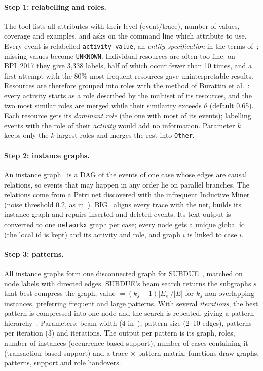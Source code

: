 \documentclass{article}
\begin{document}
\paragraph{Step 1: relabelling and roles.} The tool lists all attributes with
their level (event/trace), number of values, coverage and examples, and asks on
the command line which attribute to use. Every event is relabelled
\texttt{activity\_value}, an \emph{entity specification} in the terms
of~\cite{diamantini2016behavioral}; missing values become \texttt{UNKNOWN}.
Individual resources are often too fine: on BPI~2017 they give 3,338 labels,
half of which occur fewer than 10 times, and a first attempt with the 80\% most
frequent resources gave uninterpretable results. Resources are therefore
grouped into roles with the method of Burattin et al.~\cite{burattin2013roles}:
every activity starts as a role described by the multiset of its resources, and
the two most similar roles are merged while their similarity exceeds $\theta$
(default 0.65). Each resource gets its \emph{dominant role} (the one with most
of its events); labelling events with the role of their \emph{activity} would
add no information. Parameter $k$ keeps only the $k$ largest roles and merges
the rest into \texttt{Other}.

\paragraph{Step 2: instance graphs.} An instance graph~\cite{vandongen2004instance}
is a DAG of the events of one case whose edges are causal relations, so events
that may happen in any order lie on parallel branches. The relations come from
a Petri net discovered with the infrequent Inductive Miner (noise threshold
0.2, as in~\cite{diamantini2016behavioral}). BIG~\cite{diamantini2016big} aligns
every trace with the net, builds its instance graph and repairs inserted and
deleted events. Its text output is converted to one \texttt{networkx} graph per
case; every node gets a unique global id (the local id is kept) and its
activity and role, and graph $i$ is linked to case $i$.

\paragraph{Step 3: patterns.} All instance graphs form one disconnected graph
for SUBDUE~\cite{cook1994subdue,jonyer2002subdue}, matched on node labels with
directed edges. SUBDUE's beam search returns the subgraphs $s$ that best
compress the graph, value $=(k_s-1)|E_s|/|E|$ for $k_s$ non-overlapping
instances, preferring frequent and large patterns. With several
\emph{iterations}, the best pattern is compressed into one node and the search
is repeated, giving a pattern hierarchy~\cite{diamantini2016behavioral}.
Parameters: beam width (4 in~\cite{diamantini2016behavioral}), pattern size
(2--10 edges), patterns per iteration (3) and iterations. The output per
pattern is its graph, roles, number of instances (occurrence-based support),
number of cases containing it (transaction-based support) and a trace $\times$
pattern matrix; functions draw graphs, patterns, support and role handovers.
\end{document}

